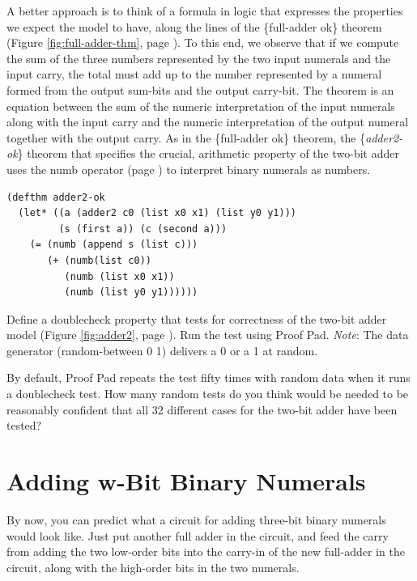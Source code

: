 A better approach is to think of a formula in logic that expresses
the properties we expect the model to have,
along the lines of the \{full-adder ok\} theorem
(Figure \ref{fig:full-adder-thm}, page \pageref{fig:full-adder-thm}).
To this end, we observe
that if we compute the sum of the three numbers represented by the two input
numerals and the input carry,
the total must add up to the number represented
by a numeral formed from the output sum-bits and
the output carry-bit.
The theorem is an equation between the
sum of the numeric interpretation of the input numerals
along with the input carry
and the numeric interpretation of the output numeral
together with the output carry.
As in the \{full-adder ok\} theorem,
the \{\emph{adder2-ok}\} theorem that specifies
the crucial, arithmetic property of the two-bit adder
uses the numb operator (page \pageref{nmb-defun})
to interpret binary numerals as numbers.

\label{adder2-ok}
\begin{Verbatim}
(defthm adder2-ok
  (let* ((a (adder2 c0 (list x0 x1) (list y0 y1)))
         (s (first a)) (c (second a)))
    (= (numb (append s (list c)))
       (+ (numb(list c0))
          (numb (list x0 x1))
          (numb (list y0 y1))))))
\end{Verbatim}


\begin{ExerciseList}
\Exercise Define a doublecheck property that tests
for correctness of the two-bit adder model
(Figure \ref{fig:adder2}, page \pageref{fig:adder2}).
Run the test using Proof Pad.
\emph{Note}: The data generator (random-between 0 1) delivers
a 0 or a 1 at random.

\Exercise By default, Proof Pad repeats the test fifty times
with random data
when it runs a doublecheck test.
How many random tests do you think would be needed to be reasonably
confident that all 32 different cases for the two-bit adder have been tested?
\end{ExerciseList}

\section{Adding w-Bit Binary Numerals}
\label{sec:adding-w-bit-numerals}

By now, you can predict what a circuit for adding three-bit
binary numerals would look like.
Just put another full adder in the circuit, and feed the
carry from adding the two low-order bits into the carry-in
of the new full-adder in the circuit, along with
the high-order bits in the two numerals.

